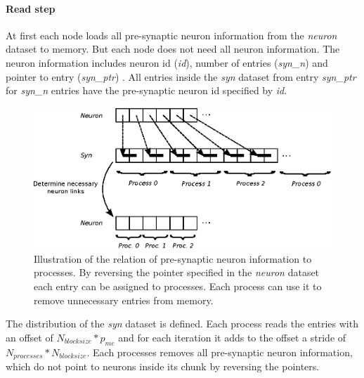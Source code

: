 \paragraph{Read step}
At first each node loads all pre-synaptic neuron information from the \emph{neuron} dataset to memory.
But each node does not need all neuron information. 
The neuron information includes neuron id (\emph{id}), number of entries  (\emph{syn\_n}) and pointer to entry (\emph{syn\_ptr}) .
All entries inside the \emph{syn} dataset from  entry \emph{syn\_ptr} for \emph{syn\_n} entries have the pre-synaptic neuron id specified by \emph{id}.
\begin{figure}[ht!]
\centering
\includegraphics[scale=1.0]{pictures/NeuronLinksRemoving.eps}
\caption{Illustration of the relation of pre-synaptic neuron information to processes.
By reversing the pointer specified in the \emph{neuron} dataset
each entry can be assigned to processes.
Each process can use it to remove unnecessary entries from memory.
}
\label{fig:neuonlinksremoving}
\end{figure}
The distribution of the \emph{syn} dataset is defined.
Each process reads the entries with an offset of $N_{blocksize} * p_{me}$ and
for each iteration it adds to the offset a stride of $N_{processes} * N_{blocksize}$.
Each processes removes all pre-synaptic neuron information, which do not point to
neurons inside its chunk by reversing the pointers.

